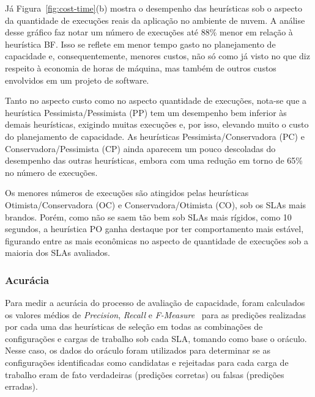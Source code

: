 \documentclass[12pt]{article}
\begin{document}
Já Figura~\ref{fig:cost-time}(b) mostra o desempenho das heurísticas sob 
o aspecto da quantidade de execuções reais da aplicação no ambiente de
nuvem. A análise desse gráfico faz notar um número de execuções até 88\% menor em 
relação à heurística BF. Isso se reflete em menor tempo gasto no 
planejamento de capacidade e, consequentemente, menores custos, não só como já 
visto no que diz respeito à economia de horas de máquina, mas também de outros 
custos envolvidos em um projeto de software.


Tanto no aspecto custo como no aspecto quantidade de execuções, nota-se que a
heurística Pessimista/Pessimista (PP) tem um desempenho bem inferior às demais heurísticas, exigindo muitas
execuções e, por isso, elevando muito o custo do planejamento de capacidade. As
heurísticas Pessimista/Conservadora (PC) e Conservadora/Pessimista (CP) ainda aparecem
um pouco descoladas do desempenho das outras heurísticas, embora com uma redução
em torno de 65\% no número de execuções.

Os menores números de execuções são atingidos pelas heurísticas Otimista/Conservadora (OC) 
e Conservadora/Otimista (CO), sob os SLAs mais brandos. Porém, como não se saem tão 
bem sob SLAs mais rígidos, como 10 segundos, a heurística PO
ganha destaque por ter comportamento mais estável, figurando entre as mais 
econômicas no aspecto de quantidade de execuções sob a maioria dos SLAs avaliados.

\subsubsection{Acurácia}

\unboldmath

Para medir a acurácia do processo de avaliação de capacidade, foram calculados os valores médios de \emph{Precision},
\emph{Recall} e \emph{F-Measure}~\cite{Baeza-Yates1999} para as predições realizadas por cada uma das heurísticas de seleção em todas as combinações de configurações e cargas de trabalho sob cada SLA, tomando como base o oráculo.  Nesse caso, os dados do oráculo foram utilizados para determinar se as configurações identificadas como candidatas e rejeitadas para cada carga de trabalho eram de fato verdadeiras (predições corretas) ou falsas (predições erradas).
\end{document}
